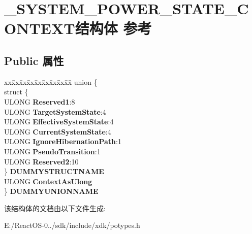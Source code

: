 \hypertarget{struct___s_y_s_t_e_m___p_o_w_e_r___s_t_a_t_e___c_o_n_t_e_x_t}{}\section{\+\_\+\+S\+Y\+S\+T\+E\+M\+\_\+\+P\+O\+W\+E\+R\+\_\+\+S\+T\+A\+T\+E\+\_\+\+C\+O\+N\+T\+E\+X\+T结构体 参考}
\label{struct___s_y_s_t_e_m___p_o_w_e_r___s_t_a_t_e___c_o_n_t_e_x_t}
\subsection*{Public 属性}
\begin{DoxyCompactItemize}
\item 
\mbox{\label{struct___s_y_s_t_e_m___p_o_w_e_r___s_t_a_t_e___c_o_n_t_e_x_t_a15243a733a3f73362a8b4fae3546e5fe}} 
\begin{tabbing}
xx\=xx\=xx\=xx\=xx\=xx\=xx\=xx\=xx\=\kill
union \{\\
\>struct \{\\
\>\>ULONG {\bfseries Reserved1}:8\\
\>\>ULONG {\bfseries TargetSystemState}:4\\
\>\>ULONG {\bfseries EffectiveSystemState}:4\\
\>\>ULONG {\bfseries CurrentSystemState}:4\\
\>\>ULONG {\bfseries IgnoreHibernationPath}:1\\
\>\>ULONG {\bfseries PseudoTransition}:1\\
\>\>ULONG {\bfseries Reserved2}:10\\
\>\} {\bfseries DUMMYSTRUCTNAME}\\
\>ULONG {\bfseries ContextAsUlong}\\
\} {\bfseries DUMMYUNIONNAME}\\

\end{tabbing}\end{DoxyCompactItemize}


该结构体的文档由以下文件生成\+:\begin{DoxyCompactItemize}
\item 
E\+:/\+React\+O\+S-\/0../sdk/include/xdk/potypes.\+h\end{DoxyCompactItemize}
